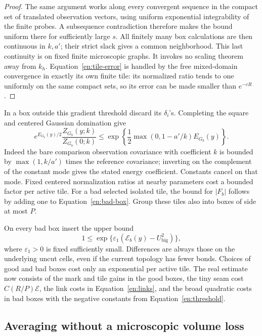 \begin{proof}
The same argument works along every convergent sequence in the compact
set of translated observation vectors, using uniform exponential
integrability of the finite probes.  A subsequence contradiction
therefore makes the bound uniform there for sufficiently large $s$.
All finitely many box calculations are then continuous in $k,a'$;
their strict slack gives a common neighborhood.  This last continuity
is on fixed finite microscopic graphs.  It invokes no scaling theorem
away from $k_h$.  Equation~\eqref{en:tile-error} is handled by the
free mixed-domain convergence in exactly its own finite tile: its
normalized ratio tends to one uniformly on the same compact sets,
so its error can be made smaller than $e^{-cR}$.
\end{proof}

In a box outside this gradient threshold discard its $\delta_i$'s.
Completing the square and centered Gaussian domination give
\begin{equation}\label{en:bad-box}
 e^{E_{G_b}(y)/2}\frac{Z_{G_b}(y;k)}{Z_{G_b}(0;k)}
 \leq\exp\left\{\frac12\max(0,1-a'/k)E_{G_b}(y)\right\}.
\end{equation}
Indeed the bare comparison observation covariance with coefficient
$k$ is bounded by $\max(1,k/a')$ times the reference covariance;
inverting on the complement of the constant mode gives the stated
energy coefficient.  Constants cancel on that mode.  Fixed centered
normalization ratios at nearby parameters cost a bounded factor per
active tile.  For a bad selected isolated tile, the bound for
$|F_b|$ follows by adding one to Equation~\eqref{en:bad-box}.
Group these tiles also into boxes of side at most $P$.

On every bad box insert the upper bound
\begin{equation}\label{en:threshold}
       1\leq\exp\{\varepsilon_1(
                \mathcal E_b(y)-U_{\mathrm{big}}^2)\},
\end{equation}
where $\varepsilon_1>0$ is fixed sufficiently small.  Differences are
always those on the underlying uncut cells, even if the current
topology has fewer bonds.  Choices of good and bad boxes cost only
an exponential per active tile.  The real estimate now consists of
the mark and tile gains in the good boxes, the tiny seam cost
$C(R/P)\mathcal E$, the link costs in Equation~\eqref{en:links},
and the broad quadratic costs in bad boxes with the negative constants
from Equation~\eqref{en:threshold}.

\subsection{Averaging without a microscopic volume loss}

